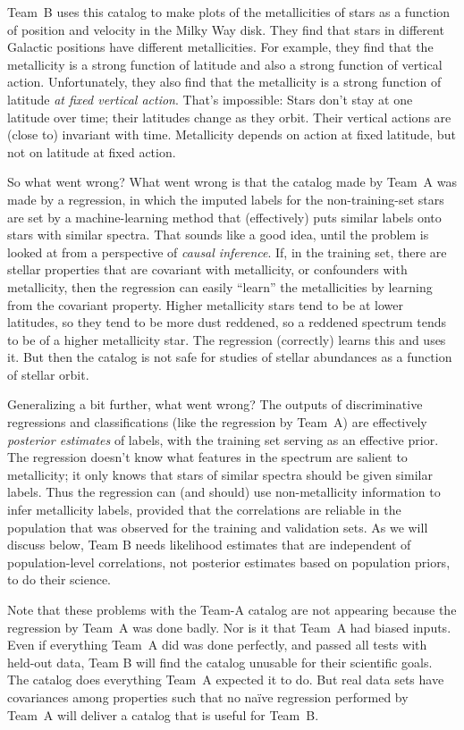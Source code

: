 \documentclass[10pt]{article}
\begin{document}
Team~B uses this catalog to make plots of the metallicities of stars as a function of position and velocity in the Milky Way disk.
They find that stars in different Galactic positions have different metallicities.
For example, they find that the metallicity is a strong function of latitude and also a strong function of vertical action.
Unfortunately, they also find that the metallicity is a strong function of latitude \emph{at fixed vertical action}.
That's impossible: Stars don't stay at one latitude over time; their latitudes change as they orbit.
Their vertical actions are (close to) invariant with time.
Metallicity depends on action at fixed latitude, but not on latitude at fixed action.

So what went wrong?
What went wrong is that the catalog made by Team~A was made by a regression, in which the imputed labels for the non-training-set stars are set by a machine-learning method that (effectively) puts similar labels onto stars with similar spectra.
That sounds like a good idea, until the problem is looked at from a perspective of \emph{causal inference}.
If, in the training set, there are stellar properties that are covariant with metallicity, or confounders with metallicity, then the regression can easily ``learn'' the metallicities by learning from the covariant property.
Higher metallicity stars tend to be at lower latitudes, so they tend to be more dust reddened, so a reddened spectrum tends to be of a higher metallicity star.
The regression (correctly) learns this and uses it.
But then the catalog is not safe for studies of stellar abundances as a function of stellar orbit.

Generalizing a bit further, what went wrong?
The outputs of discriminative regressions and classifications (like the regression by Team~A) are effectively \emph{posterior estimates} of labels, with the training set serving as an effective prior.
The regression doesn't know what features in the spectrum are salient to metallicity; it only knows that stars of similar spectra should be given similar labels.
Thus the regression can (and should) use non-metallicity information to infer metallicity labels, provided that the correlations are reliable in the population that was observed for the training and validation sets.
As we will discuss below, Team B needs likelihood estimates that are independent of population-level correlations, not posterior estimates based on population priors, to do their science.

Note that these problems with the Team-A catalog are not appearing because the regression by Team~A was done badly.
Nor is it that Team~A had biased inputs.
Even if everything Team~A did was done perfectly, and passed all tests with held-out data, Team B will find the catalog unusable for their scientific goals.
The catalog does everything Team~A expected it to do.
But real data sets have covariances among properties such that no na\"ive regression performed by Team~A will deliver a catalog that is useful for Team~B.
\end{document}
